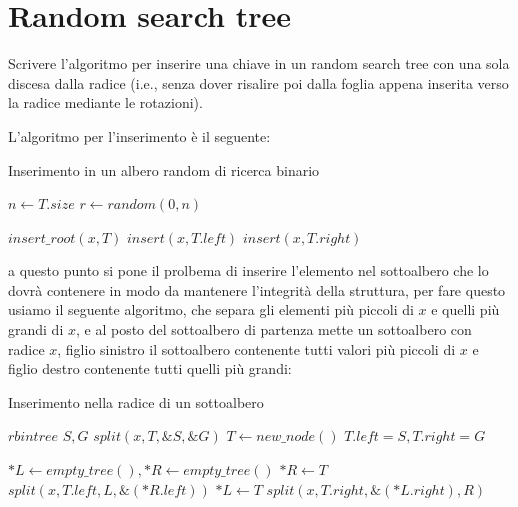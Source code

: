 \chapter{Random search tree}

\begin{problem*}
  Scrivere l'algoritmo per inserire una chiave in un random search tree
  con una sola discesa dalla radice (i.e., senza dover risalire poi dalla
  foglia appena inserita verso la radice mediante le rotazioni).
\end{problem*}

L'algoritmo per l'inserimento è il seguente:

\begin{algorithm}
    \caption{Inserimento in un albero random di ricerca binario}
    \begin{algorithmic}[1]
            \State $n \gets T.size$
            \State $r \gets random(0, n)$

                \State $insert\_root(x, T)$
            \EndIf
                \State $insert(x, T.left)$
            \Else
                \State $insert(x, T.right)$
            \EndIf
        \EndFunction
    \end{algorithmic}
\end{algorithm}

a questo punto si pone il prolbema di inserire l'elemento nel sottoalbero
che lo dovrà contenere in modo da mantenere l'integrità della struttura,
per fare questo usiamo il seguente algoritmo, che separa gli elementi più
piccoli di $x$ e quelli più grandi di $x$, e al posto del sottoalbero di
partenza mette un sottoalbero con radice $x$, figlio sinistro il sottoalbero
contenente tutti valori più piccoli di $x$ e figlio destro contenente tutti
quelli più grandi:

\begin{algorithm}
    \caption{Inserimento nella radice di un sottoalbero}
    \begin{algorithmic}[1]
            \State $rbintree$ $S, G$
            \State $split(x, T, \&S, \&G)$
            \State $T \gets new\_node()$
            \State $T.left = S, T.right = G$
            \State {}
        \EndFunction

                \State $*L \gets empty\_tree(), *R \gets empty\_tree()$
                \State \Return {}
            \EndIf
                \State $*R \gets T$
                \State $split(x, T.left, L, \&(*R.left))$
            \Else
                \State $*L \gets T$
                \State $split(x, T.right, \&(*L.right), R)$
            \EndIf
            \State \Return {}
        \EndFunction
    \end{algorithmic}
\end{algorithm}